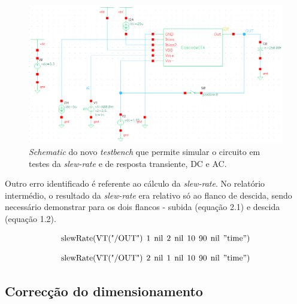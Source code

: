 \documentclass[11pt]{article}
\numberwithin{equation}{section}
\begin{document}
\begin{figure}[H]
	\centering
	\includegraphics[keepaspectratio=true, scale=0.50]{exps/testebenchantigo}
	\vspace{-0.5em}
	\caption{\textit{Schematic} do novo \textit{testbench} que permite simular o circuito em testes da \textit{slew-rate} e de resposta transiente, DC e AC.}
	\vspace{-0.8em}
\end{figure} 

Outro erro identificado é referente ao cálculo da \textit{slew-rate}. No relatório intermédio, o resultado da \textit{slew-rate} era relativo só ao flanco de descida, sendo necessário demonstrar para os dois flancos - subida (equação 2.1) e descida (equação 1.2). 

\vspace{-3mm}
\begin{equation}
	\text{slewRate} (\text{VT("/OUT")} \:\: 1 \:\: \text{nil} \:\: 2 \:\: \text{nil} \:\: 10 \:\: 90 \:\: \text{nil} \:\: "\text{time}")
\end{equation}

\vspace{-3mm}
\begin{equation}
	\text{slewRate} (\text{VT("/OUT")} \:\: 2 \:\: \text{nil} \:\: 1 \:\: \text{nil} \:\: 10 \:\: 90 \:\: \text{nil} \:\: "\text{time}")
\end{equation}



\subsection{Correcção do dimensionamento}
\end{document}
